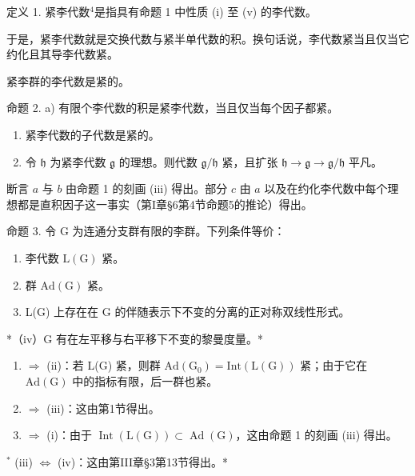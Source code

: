 定义 1. 紧李代数\(^{4}\)是指具有命题 1 中性质 (i) 至 (v) 的李代数。

于是，紧李代数就是交换代数与紧半单代数的积。换句话说，李代数紧当且仅当它约化且其导李代数紧。

紧李群的李代数是紧的。

命题 2. a) 有限个李代数的积是紧李代数，当且仅当每个因子都紧。

\begin{enumerate}
\def\labelenumi{\alph{enumi})}
\setcounter{enumi}{1}
\item
  紧李代数的子代数是紧的。
\item
  令 \(\mathfrak{h}\) 为紧李代数 \(\mathfrak{g}\) 的理想。则代数 \(\mathfrak{g} / \mathfrak{h}\) 紧，且扩张 \(\mathfrak{h} \to \mathfrak{g} \to \mathfrak{g} / \mathfrak{h}\) 平凡。
\end{enumerate}

断言 \(a\) 与 \(b\) 由命题 1 的刻画 (iii) 得出。部分 \(c\) 由 \(a\) 以及在约化李代数中每个理想都是直积因子这一事实（第I章§6第4节命题5的推论）得出。

命题 3. 令 G 为连通分支群有限的李群。下列条件等价：

\begin{enumerate}
\def\labelenumi{(\roman{enumi})}
\item
  李代数 \(\mathrm{L}(\mathrm{G})\) 紧。
\item
  群 \(\mathrm{Ad}(\mathrm{G})\) 紧。
\item
  L(G) 上存在在 G 的伴随表示下不变的分离的正对称双线性形式。
\end{enumerate}

*（iv）G 有在左平移与右平移下不变的黎曼度量。*

\begin{enumerate}
\def\labelenumi{(\roman{enumi})}
\item
  \(\Longrightarrow\) (ii)：若 L(G) 紧，则群 \(\mathrm{Ad}(\mathrm{G}_{0}) = \mathrm{Int}(\mathrm{L}(\mathrm{G}))\) 紧；由于它在 \(\mathrm{Ad}(\mathrm{G})\) 中的指标有限，后一群也紧。
\item
  \(\Longrightarrow\) (iii)：这由第1节得出。
\item
  \(\Longrightarrow\) (i)：由于 \(\operatorname{Int}(\mathrm{L}(\mathrm{G})) \subset \operatorname{Ad}(\mathrm{G})\)，这由命题 1 的刻画 (iii) 得出。
\end{enumerate}

\(^{*}\) (iii) \(\Longleftrightarrow\) (iv)：这由第III章§3第13节得出。*

